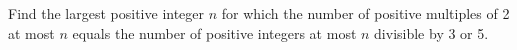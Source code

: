 Find the largest positive integer $n$ for which the number of positive multiples of 2 at most $n$ equals the number of positive integers at most $n$ divisible by 3 or 5.

